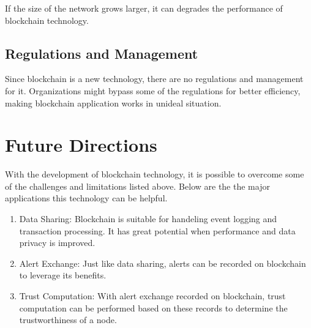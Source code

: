 \documentclass[12pt]{report}
\begin{document}
If the size of the network grows larger, it can degrades the performance of blockchain technology.

\subsection{Regulations and Management}

Since blockchain is a new technology, there are no regulations and management for it. Organizations might bypass some of the regulations for better efficiency, making blockchain application works in unideal situation.

\section{Future Directions}

With the development of blockchain technology, it is possible to overcome some of the challenges and limitations listed above. Below are the the major applications this technology can be helpful.

\begin{enumerate}
	\item{Data Sharing}: Blockchain is suitable for handeling event logging and transaction processing. It has great potential when performance and data privacy is improved.
	\item{Alert Exchange}: Just like data sharing, alerts can be recorded on blockchain to leverage its benefits.
	\item{Trust Computation}: With alert exchange recorded on blockchain, trust computation can be performed based on these records to determine the trustworthiness of a node.
\end{enumerate}



\end{document}
